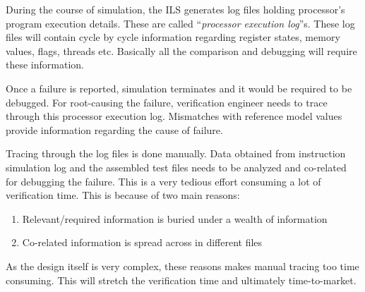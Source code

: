 \label{verif:exelog}
During the course of simulation, the ILS generates log files holding processor's program execution details. These are called ``\emph {processor execution log}''s. These log files will contain cycle by cycle information regarding register states, memory values, flags, threads etc. Basically all the comparison and debugging will require these information.

Once a failure is reported, simulation terminates and it would be required to be debugged. For root-causing the failure, verification engineer needs to trace through this processor execution log. Mismatches with reference model values provide information regarding the cause of failure.

Tracing through the log files is done manually. Data obtained from instruction simulation log and the assembled test files needs to be analyzed and co-related for debugging the failure. This is a very tedious effort consuming a lot of verification time. This is because of two main reasons:

\begin{enumerate}
	\item Relevant/required information is buried under a wealth of information
	\item Co-related information is spread across in different files
\end{enumerate}

As the design itself is very complex, these reasons makes manual tracing too time consuming. This will stretch the verification time and ultimately time-to-market.   


